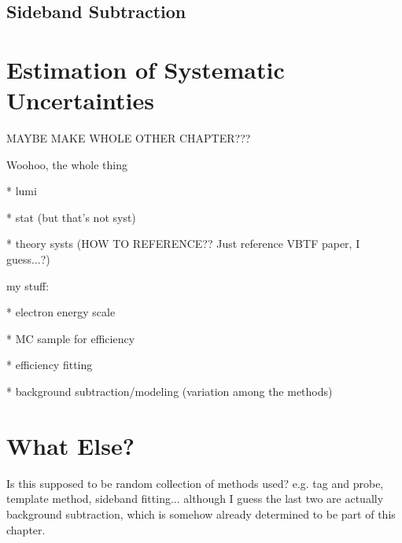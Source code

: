 \subsection{Sideband Subtraction}



\section{Estimation of Systematic Uncertainties}
MAYBE MAKE WHOLE OTHER CHAPTER???

Woohoo, the whole thing

   * lumi

   * stat (but that's not syst)

   * theory systs (HOW TO REFERENCE??  Just reference VBTF paper, I guess...?)

my stuff: 

   * electron energy scale
  
   * MC sample for efficiency

   * efficiency fitting

   * background subtraction/modeling (variation among the methods)

\section{What Else?}
Is this supposed to be random collection of methods used?  
e.g. tag and probe, template method, sideband fitting... 
although I guess the last two are actually background subtraction, 
which is somehow already determined to be part of this chapter.  